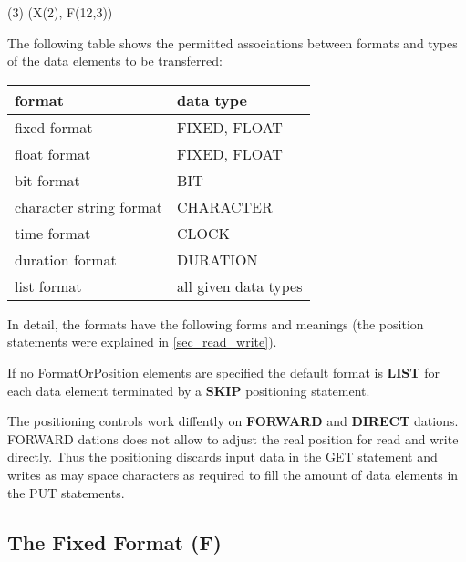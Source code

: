 (3) (X(2), F(12,3))

The following table shows the permitted associations between formats and
types of the data elements to be transferred:

\begin{tabular}{ll}
format                  & data type \\ \hline
fixed format            & FIXED, FLOAT \\
float format            & FIXED, FLOAT \\
bit format              & BIT          \\
character string format & CHARACTER    \\
time format             & CLOCK        \\
duration format         & DURATION     \\
list format             & all given data types
\end{tabular}

In detail, the formats have the following forms and meanings (the
position statements were explained in \ref{sec_read_write}).

If no FormatOrPosition elements are specified the default format is {\bf LIST} for
each data element terminated by a {\bf SKIP} positioning statement.

The positioning controls work diffently on {\bf FORWARD} and {\bf DIRECT}
dations. FORWARD dations does not allow to adjust the real position for read
and write directly. 
Thus the positioning discards input data in the GET statement and 
writes as may space characters as required to fill the amount of data elements
in the PUT statements.


\subsection{The Fixed Format (F)}   %
\label{sec_dation_f_format}








